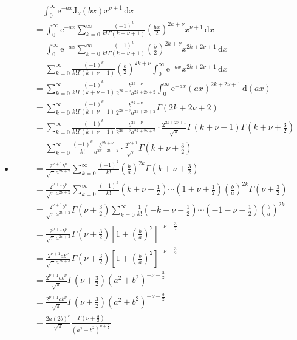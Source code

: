 \documentclass[fontset=windows]{ctexart}
\begin{document}
\begin{itemize}
    \item[1.(3)]
    \begin{align*}
    &\quad \int_0^{\infty}\mathrm{e}^{-ax}\mathrm{J}_\nu(bx)x^{\nu+1}\,\mathrm{d}x \\
    &= \int_0^{\infty}\mathrm{e}^{-ax}\sum_{k=0}^{\infty}\frac{(-1)^k}{k!\Gamma(k+\nu+1)}\left(\frac{bx}{2}\right)^{2k+\nu}x^{\nu+1}\,\mathrm{d}x \\
    &= \int_0^{\infty}\mathrm{e}^{-ax}\sum_{k=0}^{\infty}\frac{(-1)^k}{k!\Gamma(k+\nu+1)}\left(\frac{b}{2}\right)^{2k+\nu}x^{2k+2\nu+1}\,\mathrm{d}x \\
    &= \sum_{k=0}^{\infty}\frac{(-1)^k}{k!\Gamma(k+\nu+1)}\left(\frac{b}{2}\right)^{2k+\nu}\int_0^{\infty}\mathrm{e}^{-ax}x^{2k+2\nu+1}\,\mathrm{d}x \\
    &= \sum_{k=0}^{\infty}\frac{(-1)^k}{k!\Gamma(k+\nu+1)}\frac{b^{2k+\nu}}{2^{2k+\nu}a^{2k+2\nu+2}}\int_0^{\infty}\mathrm{e}^{-ax}(ax)^{2k+2\nu+1}\,\mathrm{d}(ax) \\
    &= \sum_{k=0}^{\infty}\frac{(-1)^k}{k!\Gamma(k+\nu+1)}\frac{b^{2k+\nu}}{2^{2k+\nu}a^{2k+2\nu+2}}\Gamma(2k+2\nu+2) \\
    &= \sum_{k=0}^{\infty}\frac{(-1)^k}{k!\Gamma(k+\nu+1)}\frac{b^{2k+\nu}}{2^{2k+\nu}a^{2k+2\nu+2}}\cdot\frac{2^{2k+2\nu+1}}{\sqrt{\pi}}\Gamma(k+\nu+1)\Gamma(k+\nu+\frac{3}{2}) \\
    &= \sum_{k=0}^{\infty}\frac{(-1)^k}{k!}\frac{b^{2k+\nu}}{a^{2k+2\nu+2}}\cdot\frac{2^{\nu+1}}{\sqrt{\pi}}\Gamma\left(k+\nu+\frac{3}{2}\right) \\
    &= \frac{2^{\nu+1}b^{\nu}}{\sqrt{\pi}a^{2\nu+2}}\sum_{k=0}^{\infty}\frac{(-1)^k}{k!}\left(\frac{b}{a}\right)^{2k}\Gamma\left(k+\nu+\frac{3}{2}\right) \\
    &= \frac{2^{\nu+1}b^{\nu}}{\sqrt{\pi}a^{2\nu+2}}\sum_{k=0}^{\infty}\frac{(-1)^k}{k!}\left(k+\nu+\frac{1}{2}\right)\cdots\left(1+\nu+\frac{1}{2}\right)\left(\frac{b}{a}\right)^{2k}\Gamma\left(\nu+\frac{3}{2}\right) \\
    &= \frac{2^{\nu+1}b^{\nu}}{\sqrt{\pi}a^{2\nu+2}}\Gamma\left(\nu+\frac{3}{2}\right)\sum_{k=0}^{\infty}\frac{1}{k!}\left(-k-\nu-\frac{1}{2}\right)\cdots\left(-1-\nu-\frac{1}{2}\right)\left(\frac{b}{a}\right)^{2k} \\
    &= \frac{2^{\nu+1}b^{\nu}}{\sqrt{\pi}a^{2\nu+2}}\Gamma\left(\nu+\frac{3}{2}\right)\left[1+\left(\frac{b}{a}\right)^2\right]^{-\nu-\tfrac{3}{2}} \\
    &= \frac{2^{\nu+1}ab^{\nu}}{\sqrt{\pi}a^{2\nu+3}}\Gamma\left(\nu+\frac{3}{2}\right)\left[1+\left(\frac{b}{a}\right)^2\right]^{-\nu-\tfrac{3}{2}} \\
    &= \frac{2^{\nu+1}ab^{\nu}}{\sqrt{\pi}}\Gamma\left(\nu+\frac{3}{2}\right)\left(a^2+b^2\right)^{-\nu-\tfrac{3}{2}} \\
    &= \frac{2^{\nu+1}ab^{\nu}}{\sqrt{\pi}}\Gamma\left(\nu+\frac{3}{2}\right)\left(a^2+b^2\right)^{-\nu-\tfrac{3}{2}} \\
    &= \frac{2a(2b)^{\nu}}{\sqrt{\pi}}\frac{\Gamma\left(\nu+\tfrac{3}{2}\right)}{\left(a^2+b^2\right)^{\nu+\tfrac{3}{2}}}
    \end{align*}
    \bigskip


\end{itemize}
\end{document}

